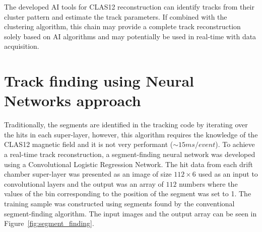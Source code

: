 \documentclass[a4paper,11pt]{article}
\begin{document}
The developed AI tools for CLAS12 reconstruction can identify tracks from their cluster pattern and estimate the track parameters.
If combined with the clustering algorithm, this chain may provide a complete track reconstruction solely based on AI algorithms and
may potentially be used in real-time with data acquisition. 

\section{Track finding using Neural Networks approach}

Traditionally, the segments are identified in the tracking code by iterating over the hits in each super-layer, however, this algorithm requires the knowledge of the CLAS12 magnetic field and it is not very performant ($\sim 15 ms/event$). To achieve a real-time track reconstruction, a segment-finding neural network was developed using a Convolutional Logistic Regression Network.
The hit data from each drift chamber super-layer was presented as an image of size $112\times6$ used as an input to convolutional layers and the output was an array of $112$ numbers where the values of the bin corresponding to the position of the segment was set to 1.  The training sample was constructed using segments found by the conventional segment-finding algorithm. The input images and the output array can be seen in Figure~\ref{fig:segment_finding}. 
\end{document}
